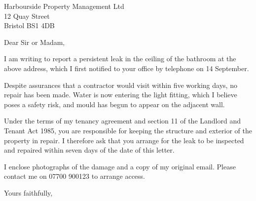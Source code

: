 \documentclass[11pt]{letter}
\date{3 October 2026}
\begin{document}
\begin{letter}{Harbourside Property Management Ltd\\12 Quay Street\\Bristol BS1 4DB}

\opening{Dear Sir or Madam,}

I am writing to report a persistent leak in the ceiling of the bathroom at the above
address, which I first notified to your office by telephone on 14 September.

Despite assurances that a contractor would visit within five working days, no repair has
been made. Water is now entering the light fitting, which I believe poses a safety risk,
and mould has begun to appear on the adjacent wall.

Under the terms of my tenancy agreement and section 11 of the Landlord and Tenant Act
1985, you are responsible for keeping the structure and exterior of the property in
repair. I therefore ask that you arrange for the leak to be inspected and repaired within
seven days of the date of this letter.

I enclose photographs of the damage and a copy of my original email. Please contact me on
07700 900123 to arrange access.

\closing{Yours faithfully,}


\end{letter}
\end{document}

